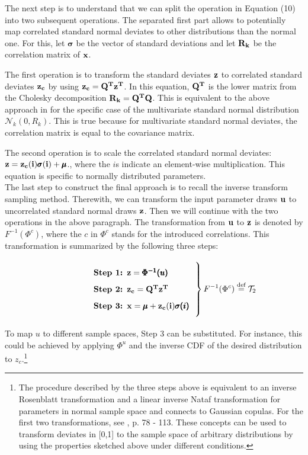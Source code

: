 \noindent
The next step is to understand that we can split the operation in Equation (10) into two subsequent operations. The separated first part allows to potentially map correlated standard normal deviates to other distributions than the normal one. For this, let $\pmb{\sigma}$ be the vector of standard deviations and let $\bold{R_k}$ be the correlation matrix of $\bold{x}$.

The first operation is to transform the standard deviates $\bold{z}$ to correlated standard deviates $\bold{z_c}$ by using $\bold{z_c}=\bold{Q^T z^T}$. In this equation, $\bold{Q^T}$ is the lower matrix from the Cholesky decomposition $\bold{R_k}=\bold{Q^T Q}$. This is equivalent to the above approach in \cite{gentle2006random} for the specific case of the multivariate standard normal distribution $\mathcal{N}_k(0, R_k)$. This is true because for multivariate standard normal deviates, the correlation matrix is equal to the covariance matrix.

The second operation is to scale the correlated standard normal deviates: $\bold{z}=\bold{z_c(i)}\pmb{\sigma}\bold{(i)} + \pmb{\mu}$., where the $i$s indicate an element-wise multiplication. This equation is specific to normally distributed parameters.\\

\noindent
The last step to construct the final approach is to recall the inverse transform sampling method. Therewith, we can transform the input parameter draws $\bold{u}$ to uncorrelated standard normal draws $\bold{z}$. Then we will continue with the two operations in the above paragraph. The transformation from $\bold{u}$ to $\bold{z}$ is denoted by $ F^{-1}(\Phi^c)$, where the $c$ in  $\Phi^c$ stands for the introduced correlations. This transformation is summarized by the following three steps:


\[
\left.\parbox{0.5\textwidth}{%
	\begin{enumerate}[label=\bfseries Step \arabic*:,leftmargin=*,labelindent=5em]
	\item $\bold{z} = \pmb{\Phi^{-1}({u})}$
	\item $\bold{z_c} = \bold{Q^T z^T}$
	\item $\bold{x} = \pmb{\mu} + \bold{z_c(i)}\pmb{\sigma(i)}$
	\end{enumerate}
}\right\}F^{-1}(\Phi^c) \defeq \mathcal{T}_2
\]

\noindent
To map $u$ to different sample spaces, Step 3 can be substituted. For instance, this could be achieved by applying $\Phi^u$ and the inverse CDF of the desired distribution to $z_c$.\footnote{The procedure described by the three steps above is equivalent to an inverse Rosenblatt transformation and a linear inverse Nataf transformation for parameters in normal sample space and connects to Gaussian copulas. For the first two transformations, see \cite{lemaire2013structural}, p. 78 - 113. These concepts can be used to transform deviates in [0,1] to the sample space of arbitrary distributions by using the properties sketched above under different conditions.}\\

